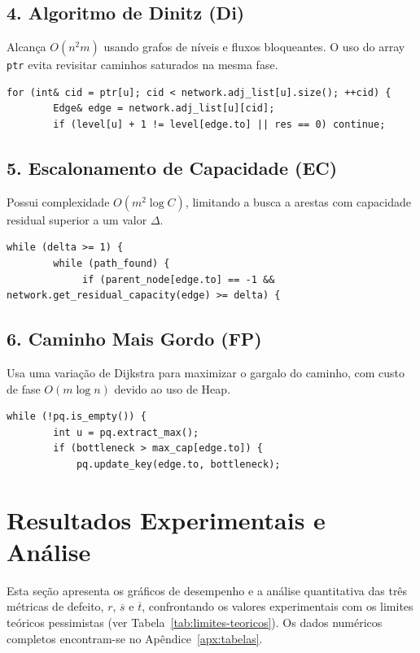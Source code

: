 \documentclass{infufrgs}
\begin{document}
\subsection{4. Algoritmo de Dinitz (Di)}
Alcança $O(n^2m)$ usando grafos de níveis e fluxos bloqueantes. O uso do array \texttt{ptr} evita revisitar caminhos saturados na mesma fase.
\begin{lstlisting}[caption={Poda de busca no grafo de níveis em Dinitz.cpp}]
    for (int& cid = ptr[u]; cid < network.adj_list[u].size(); ++cid) {
        Edge& edge = network.adj_list[u][cid];
        if (level[u] + 1 != level[edge.to] || res == 0) continue;
\end{lstlisting}

\subsection{5. Escalonamento de Capacidade (EC)}
Possui complexidade $O(m^2 \log C)$, limitando a busca a arestas com capacidade residual superior a um valor $\Delta$.
\begin{lstlisting}[caption={Controle de Delta em CapacityScaling.cpp}]
    while (delta >= 1) {
        while (path_found) {
             if (parent_node[edge.to] == -1 && network.get_residual_capacity(edge) >= delta) {
\end{lstlisting}

\subsection{6. Caminho Mais Gordo (FP)}
Usa uma variação de Dijkstra para maximizar o gargalo do caminho, com custo de fase $O(m \log n)$ devido ao uso de Heap.
\begin{lstlisting}[caption={Uso de Priority Queue em FattestPath.cpp}]
    while (!pq.is_empty()) {
        int u = pq.extract_max();
        if (bottleneck > max_cap[edge.to]) {
            pq.update_key(edge.to, bottleneck); 
\end{lstlisting}



\section{Resultados Experimentais e Análise}

Esta seção apresenta os gráficos de desempenho e a análise quantitativa das três métricas
de defeito, $r$, $\overline{s}$ e $\overline{t}$, confrontando os valores experimentais
com os limites teóricos pessimistas (ver Tabela~\ref{tab:limites-teoricos}). Os dados
numéricos completos encontram-se no Apêndice~\ref{apx:tabelas}.
\end{document}
